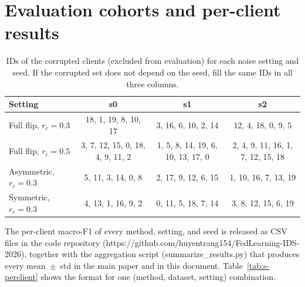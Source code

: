 \documentclass[11pt]{article}
\begin{document}
\section{Evaluation cohorts and per-client results}

\begin{table}[!ht]\centering\scriptsize
\caption{IDs of the corrupted clients (excluded from evaluation) for each noise setting and seed. If the corrupted set does not depend on the seed, fill the same IDs in all three columns.}
\label{tab:s-corrupt-ids}
\begin{tabular}{l|ccc}
\toprule
Setting & s0 & s1 & s2 \\
\midrule
Full flip, $r_c=0.3$ & 18, 1, 19, 8, 10, 17 & 3, 16, 6, 10, 2, 14 & 12, 4, 18, 0, 9, 5 \\
Full flip, $r_c=0.5$ & 3, 7, 12, 15, 0, 18, 4, 9, 11, 2 & 1, 5, 8, 14, 19, 6, 10, 13, 17, 0 & 2, 4, 9, 11, 16, 1, 7, 12, 15, 18 \\
Asymmetric, $r_c=0.3$ & 5, 11, 3, 14, 0, 8 & 2, 17, 9, 12, 6, 15 & 1, 10, 16, 7, 13, 19 \\
Symmetric, $r_c=0.3$ & 4, 13, 1, 16, 9, 2 & 0, 11, 5, 18, 7, 14 & 3, 8, 12, 15, 6, 19 \\
\bottomrule\end{tabular}\end{table}

The per-client macro-F1 of every method, setting, and seed is released as CSV files in the code repository (https://github.com/huyentrang154/FedLearning-IDS-2026), together with the aggregation script (summarize\_results.py) that produces every mean~$\pm$~std in the main paper and in this document. Table~\ref{tab:s-perclient} shows the format for one (method, dataset, setting) combination.
\end{document}
